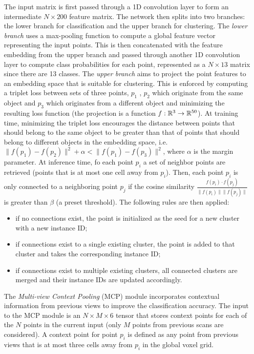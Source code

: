 The input matrix is first passed through a 1D convolution layer to form
an intermediate $N\times 200$ feature matrix. The network then splits
into two branches: the lower branch for classification and the upper
branch for clustering. The \emph{lower branch} uses a max-pooling
function to compute a global feature vector representing the input
points. This is then concatenated with the feature embedding from the
upper branch and passed through another 1D convolution layer to compute
class probabilities for each point, represented as a $N\times 13$
matrix since there are 13 classes. The \emph{upper branch} aims to
project the point features to an embedding space that is suitable for
clustering. This is enforced by computing a triplet loss between sets of
three points, $p_1$ , $p_2$ which originate from the same object and
$p_3$ which originates from a different object and minimizing the
resulting loss function (the projection is a function
$f : \mathbb{R}^{3} \rightarrow \mathbb{R}^{50}$). At training time, minimizing the
triplet loss encourages the distance between points that should belong
to the same object to be greater than that of points that should belong
to different objects in the embedding space, i.e.
$\parallel f(p_1) - f(p_2)\parallel^{2} + \alpha < \parallel f(p_1) - f(p_3)\parallel^{2}$,
where $\alpha$ is the margin parameter. At inference time, fo each
point $p_i$ a set of neighbor points are retrieved (points that is at
most one cell away from $p_i$). Then, each point $p_i$ is only
connected to a neighboring point $p_j$ if the cosine similarity
\newline
$\frac{f(p_i) \cdot f(p_j)}{\parallel f(p_i)\parallel \parallel f(p_j)\parallel}$
\newline
is greater than $\beta$ (a preset threshold). The following rules are
then applied:

\begin{itemize}
\item
  if no connections exist, the point is initialized as the seed for a
  new cluster with a new instance ID; 
\item
  if connections exist to a single existing cluster, the point is added
  to that cluster and takes the corresponding instance ID;
\item
  if connections exist to multiple existing clusters, all connected
  clusters are merged and their instance IDs are updated accordingly.
\end{itemize}

The \emph{Multi-view Context Pooling} (MCP) module incorporates
contextual information from previous views to improve the classification
accuracy. The input to the MCP module is an $N\times M\times 6$ tensor
that stores context points for each of the $N$ points in the current
input (only $M$ points from previous scans are considered). A context
point for point $p_i$ is defined as any point from previous views that
is at most three cells away from $p_i$ in the global voxel grid.

